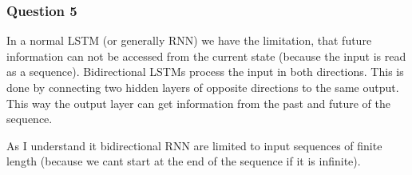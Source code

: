 \documentclass[10pt]{article}
\begin{document}
\subsubsection{Question 5}
In a normal LSTM (or generally RNN) we have the limitation, that future information can not be accessed from the current state (because the input is read as a sequence). Bidirectional LSTMs process the input in both directions. This is done by connecting two hidden layers of opposite directions to the same output. This way the output layer can get information from the past and future of the sequence.

As I understand it bidirectional RNN are limited to input sequences of finite length (because we cant start at the end of the sequence if it is infinite).
\end{document}
